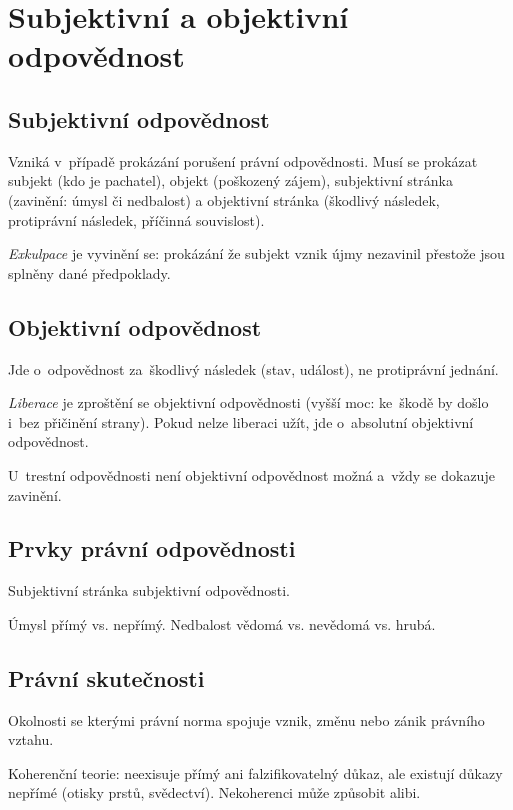 \clearpage
\section{Subjektivní a objektivní odpovědnost}

\subsection{Subjektivní odpovědnost}

Vzniká v~případě prokázání porušení právní odpovědnosti.
Musí se prokázat subjekt (kdo je pachatel), objekt (poškozený zájem), subjektivní stránka (zavinění: úmysl či nedbalost) a objektivní stránka (škodlivý následek, protiprávní následek, příčinná souvislost).

\emph{Exkulpace} je vyvinění se: prokázání že subjekt vznik újmy nezavinil přestože jsou splněny dané předpoklady.


\subsection{Objektivní odpovědnost}


Jde o~odpovědnost za~škodlivý následek (stav, událost), ne protiprávní jednání.

\emph{Liberace} je zproštění se objektivní odpovědnosti (vyšší moc: ke~škodě by došlo i~bez přičinění strany).
Pokud nelze liberaci užít, jde o~absolutní objektivní odpovědnost.

U~trestní odpovědnosti není objektivní odpovědnost možná a~vždy se dokazuje zavinění.


\subsection{Prvky právní odpovědnosti}

Subjektivní stránka subjektivní odpovědnosti.

Úmysl přímý vs. nepřímý.
Nedbalost vědomá vs. nevědomá vs. hrubá.


\subsection{Právní skutečnosti}

Okolnosti se kterými právní norma spojuje vznik, změnu nebo zánik právního vztahu.

Koherenční teorie: neexisuje přímý ani falzifikovatelný důkaz, ale existují důkazy nepřímé (otisky prstů, svědectví).
Nekoherenci může způsobit alibi.

